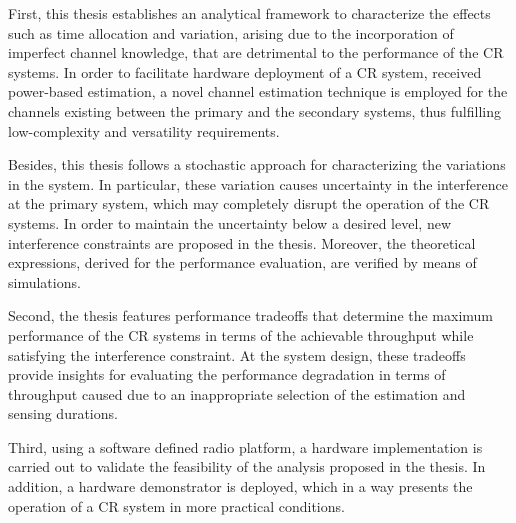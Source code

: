 First, this thesis establishes an analytical framework to characterize the effects such as time allocation and variation, arising due to the incorporation of imperfect channel knowledge, that are detrimental to the performance of the CR systems. In order to facilitate hardware deployment of a CR system, received power-based estimation, a novel channel estimation technique is employed for the channels existing between the primary and the secondary systems, thus fulfilling low-complexity and versatility requirements. 

Besides, this thesis follows a stochastic approach for characterizing the variations in the system. In particular, these variation causes uncertainty in the interference at the primary system, which may completely disrupt the operation of the CR systems. In order to maintain the uncertainty below a desired level, new interference constraints are proposed in the thesis. Moreover, the theoretical expressions, derived for the performance evaluation, are verified by means of simulations. 




Second, the thesis features performance tradeoffs that determine the maximum performance of the CR systems in terms of the achievable throughput while satisfying the interference constraint. At the system design, these tradeoffs provide insights for evaluating the performance degradation in terms of throughput caused due to an inappropriate selection of the estimation and sensing durations. 

Third, using a software defined radio platform, a hardware implementation is carried out to validate the feasibility of the analysis proposed in the thesis. In addition, a hardware demonstrator is deployed, which in a way presents the operation of a CR system in more practical conditions. %



\cleardoublepage
